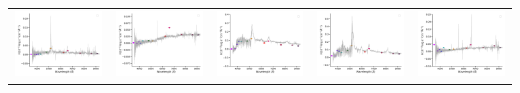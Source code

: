 \begin{center}
\begin{longtable}{l l l l l }
    \includegraphics[width=0.19\linewidth, clip]{Figs/Figs-sdss/spec-4004-55321-0054-SPLUS-n02s37-051418.pdf} & \includegraphics[width=0.19\linewidth, clip]{Figs/Figs-sdss/spec-4194-55450-0185-STRIPE82-0119-046591.pdf} & \includegraphics[width=0.19\linewidth, clip]{Figs/Figs-sdss/spec-4194-55450-0940-STRIPE82-0120-007072.pdf} & \includegraphics[width=0.19\linewidth, clip]{Figs/Figs-sdss/spec-4197-55479-0626-STRIPE82-0126-031903.pdf} & \includegraphics[width=0.19\linewidth, clip]{Figs/Figs-sdss/spec-4200-55499-0994-STRIPE82-0136-009636.pdf} \\

\end{longtable}
\end{center}
